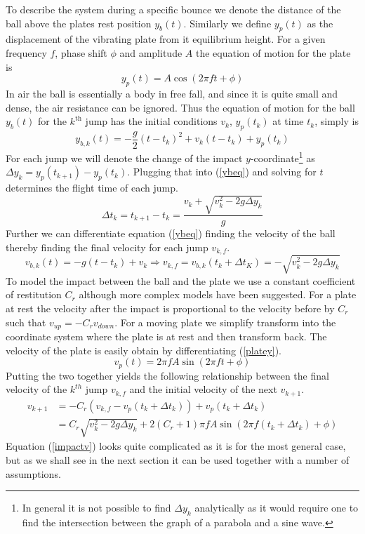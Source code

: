 \documentclass[12pt,oneside,a4paper]{article}
\numberwithin{equation}{section}
\begin{document}
{{{{To describe the system during a specific bounce we denote the distance of the ball above the plates rest position $y_b(t)$. Similarly we define $y_p(t)$ as the displacement of the vibrating  plate from it equilibrium height. For a given frequency $f$, phase shift $\phi$ and amplitude $A$ the equation of motion for the plate is
\begin{equation}
	y_p(t)= A \cos(2\pi f t+ \phi)
	\label{platey}
\end{equation}
In air the ball is essentially a body in free fall, and since it is quite small and dense, the air resistance can be ignored. Thus the equation of motion for the ball $y_b(t)$ for the $k^\text{th}$ jump has the initial conditions $v_k$, $y_p(t_k)$ at time $t_k$, simply is
\begin{equation}
	y_{b,k}(t) = -\frac{g}{2}(t-t_k)^2+v_k(t-t_k)+y_p(t_k)
	\label{ybeq}
\end{equation}
For each jump we will denote the change of the impact $y$-coordinate\footnote{In general it is not possible to find $\Delta y_k$ analytically as it would require one to find the intersection between the graph of a parabola and a sine wave.} as $\Delta y_{k}=y_p(t_{k+1})-y_p(t_{k})$. Plugging that into (\ref{ybeq}) and solving for $t$ determines the flight time of each jump.
\begin{equation}
	\Delta t_{k} = t_{k+1}-t_{k} = \frac{v_{k}+\sqrt{v_k^2-2g\Delta y_k}}{g}
	\label{flytime}
\end{equation}
Further we can differentiate equation (\ref{ybeq}) finding the velocity of the ball thereby finding the final velocity for each jump $v_{k,f}$.
\begin{equation}
	v_{b,k}(t) = -g(t-t_k)+v_k \Rightarrow v_{k,f} = v_{b,k}(t_k+\Delta t_K) = -\sqrt{v_k^2-2g\Delta y_k}
\end{equation}
To model the impact between the ball and the plate we use a constant coefficient of restitution $C_r$ although more complex models have been suggested. For a plate at rest the velocity after the impact is proportional to the velocity before by $C_r$ such that $v_{up}=-C_r v_{down}$. For a moving plate we simplify transform into the coordinate system where the plate is at rest and then transform back. The velocity of the plate is easily obtain by differentiating (\ref{platey}).
\begin{equation}
	v_p(t) = 2\pi f A \sin(2\pi f t+ \phi)
	\label{platev}
\end{equation}
Putting the two together yields the following relationship between the final velocity of the $k^{th}$ jump $v_{k,f}$ and the initial velocity of the next $v_{k+1}$.
\begin{align}
	v_{k+1} &= -C_r(v_{k,f}-v_p(t_k+\Delta t_k))+v_p(t_k+\Delta t_k) \nonumber \\
	&= C_r \sqrt{v_k^2-2g\Delta y_k}+2(C_r+1)\pi f A \sin(2\pi f (t_k+\Delta t_k)+ \phi) \label{impactv}
\end{align}
Equation (\ref{impactv}) looks quite complicated as it is for the most general case, but as we shall see in the next section it can be used together with a number of assumptions.

}}}}
\end{document}
